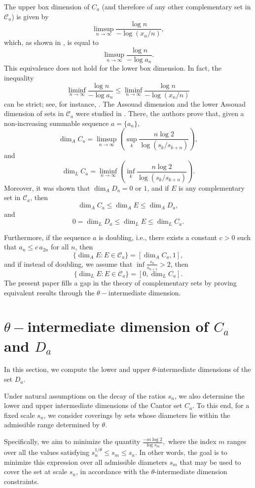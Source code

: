 \documentclass[11pt,reqno,bookmarksnumbered,raiselinks,breaklinks,colorlinks,plainpages]{amsart}
\begin{document}
The upper box dimension of $C_a$ (and therefore of any other complementary set in $\mathcal{C}_a$) is given by 
\[
\limsup_{n \to \infty} \frac{\log n}{-\log (x_n/n)},
\]
which, as shown in \cite{tricot1994curves}, is equal to 
\[
\limsup_{n \to \infty} \frac{\log n}{-\log a_n}.
\]
This equivalence does not hold for the lower box dimension. In fact, the inequality
\[
\liminf_{n \to \infty} \frac{\log n}{-\log a_n} \leq \liminf_{n \to \infty} \frac{\log n}{-\log (x_n/n)}
\]
can be strict; see, for instance, \cite[Proposition 5]{cabrelli2004hausdorff}.
The Assouad dimension and the lower Assouad dimension of sets in \( \mathcal{C}_a \) were studied in \cite{garcia2018assouad}. There, the authors prove that, given a non-increasing summable sequence \( a = \{a_n\} \),
\[
\dim_A C_a = \limsup_{n \to \infty} \left( \sup_k \frac{n \log 2}{\log(s_k / s_{k+n})} \right),
\]
and
\[
\dim_L C_a = \liminf_{n \to \infty} \left( \inf_k \frac{n \log 2}{\log(s_k / s_{k+n})} \right).
\]
Moreover, it was shown that \( \dim_A D_a = 0 \) or \( 1 \), and if \( E \) is any complementary set in \( \mathcal{C}_a \), then
\[
\dim_A C_a \leq \dim_A E \leq \dim_A D_a,
\]
and
\[
0 = \dim_L D_a \leq \dim_L E \leq \dim_L C_a.
\]

Furthermore, if the sequence \( a \) is doubling, i.e., there exists a constant \( c > 0 \) such that \( a_n \leq c \, a_{2n} \) for all \( n \), then
\[
\{\dim_A E: E \in \mathcal{C}_a\} = [\dim_A C_a, 1],
\]
and if instead of doubling, we assume that \( \inf \frac{s_n}{s_{n+1}} > 2 \), then
\[
\{\dim_L E: E \in \mathcal{C}_a\} = [0, \dim_L C_a].
\]
The present paper fills a gap in the theory of complementary sets by proving equivalent results through the 
$\theta-$intermediate dimension.
\section{$\theta-$intermediate dimension of $C_a$ and $D_a$}
In this section, we compute the lower and upper $\theta$-intermediate dimensions of the set $D_a$.

Under natural assumptions on the decay of the ratios $s_n$, we also determine the lower and upper intermediate dimensions of the Cantor set $C_a$. To this end, for a fixed scale $s_n$, we consider coverings by sets whose diameters lie within the admissible range determined by $\theta$.

Specifically, we aim to minimize the quantity  
\(
\frac{-m \log 2}{\log s_m},
\) 
where the index $m$ ranges over all the values satisfying 
\(
s_n^{1/\theta} \leq s_m \leq s_n.
\)  
In other words, the goal is to minimize this expression over all admissible diameters $s_m$ that may be used to cover the set at scale $s_n$, in accordance with the $\theta$-intermediate dimension constraints.
\end{document}
